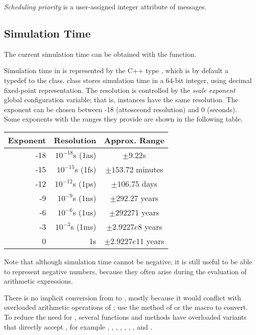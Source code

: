 \textit{Scheduling priority} is a user-assigned integer
attribute of messages.



\subsection{Simulation Time}
\label{sec:simple-modules:simulation-time}

The current simulation time can be obtained with the  function.

Simulation time in {\opp} is represented by the C++ type ,
which is by default a typedef to the  class.
 class stores simulation time in a 64-bit integer,
using decimal fixed-point representation. The resolution is controlled
by the \textit{scale exponent} global configuration variable; that is,
 instances have the same resolution. The exponent can be
chosen between -18 (attosecond resolution) and 0 (seconds).
Some exponents with the ranges they provide are shown in the following table.

\begin{center}
  \begin{tabular}{ | r | r | c | }
    \hline
    Exponent & Resolution & Approx. Range \\ \hline
     -18 & $10^{-18}$s (1as) & $\pm 9.22$s \\
     -15 & $10^{-15}$s (1fs) & $\pm 153.72$ minutes \\
     -12 & $10^{-12}$s (1ps) & $\pm 106.75$ days \\
     -9  & $10^{-9}$s (1ns)  & $\pm 292.27$ years \\
     -6  & $10^{-6}$s (1us)  & $\pm 292271$ years \\
     -3  & $10^{-3}$s (1ms)  & $\pm 2.9227e8$ years \\
     0   & 1s                & $\pm 2.9227e11$ years \\ \hline
  \end{tabular}
\end{center}

Note that although simulation time cannot be negative, it is still useful to
be able to represent negative numbers, because they often arise
during the evaluation of arithmetic expressions.

There is no implicit conversion from  to , mostly
because it would conflict with overloaded arithmetic operations of ;
use the  method of  or the  macro
to convert. To reduce the need for , several functions and methods
have overloaded variants that directly accept , for example
, , , , ,
, , and .

